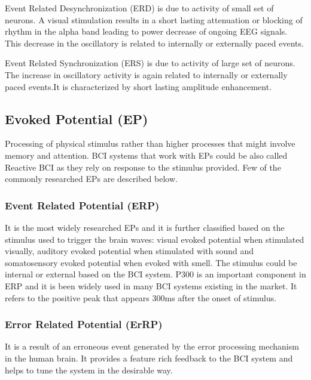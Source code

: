 Event Related Desynchronization (ERD) is due to activity of small set of neurons. A visual stimulation results in a short lasting attenuation or blocking of rhythm in the alpha band leading to power decrease of ongoing EEG signals. This decrease in the oscillatory is related to internally or externally paced events.

Event Related Synchronization (ERS) is due to activity of large set of neurons. The increase in oscillatory activity is again related to internally or externally paced events.It is characterized by short lasting amplitude enhancement.

\subsection{Evoked Potential (EP)}
Processing of physical stimulus rather than higher processes that might involve memory and attention. BCI systems that work with EPs could be also called Reactive BCI as they rely on response to the stimulus provided. Few of the commonly researched EPs are described below.

\subsubsection{Event Related Potential (ERP)}
It is the most widely researched EPs and it is further classified based on the stimulus used to trigger the brain waves: visual evoked potential when stimulated visually, auditory evoked potential when stimulated with sound and somatosensory evoked potential when evoked with smell. The stimulus could be internal or external based on the BCI system. P300 is an important component in ERP and it is been widely used in many BCI systems existing in the market. It refers to the positive peak that appears 300ms after the onset of stimulus.

\subsubsection{Error Related Potential (ErRP)}
It is a result of an erroneous event generated by the error processing mechanism in the human brain. It provides a feature rich feedback to the BCI system and helps to tune the system in the desirable way.

